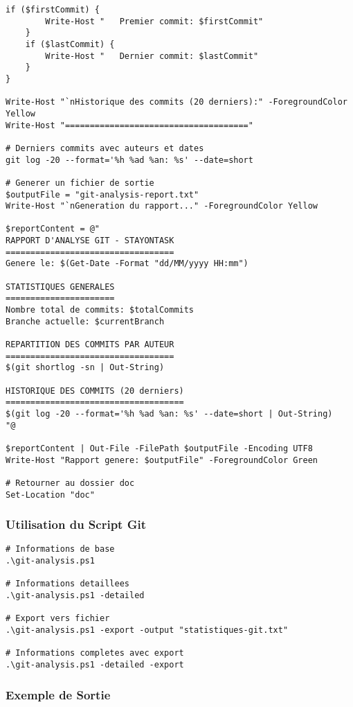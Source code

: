 \documentclass[12pt,a4paper]{article}
\begin{document}
\begin{lstlisting}[caption=Script d'extraction Git complet - git-analysis.ps1]
    if ($firstCommit) {
        Write-Host "   Premier commit: $firstCommit"
    }
    if ($lastCommit) {
        Write-Host "   Dernier commit: $lastCommit"
    }
}

Write-Host "`nHistorique des commits (20 derniers):" -ForegroundColor Yellow
Write-Host "====================================="

# Derniers commits avec auteurs et dates
git log -20 --format='%h %ad %an: %s' --date=short

# Generer un fichier de sortie
$outputFile = "git-analysis-report.txt"
Write-Host "`nGeneration du rapport..." -ForegroundColor Yellow

$reportContent = @"
RAPPORT D'ANALYSE GIT - STAYONTASK
==================================
Genere le: $(Get-Date -Format "dd/MM/yyyy HH:mm")

STATISTIQUES GENERALES
======================
Nombre total de commits: $totalCommits
Branche actuelle: $currentBranch

REPARTITION DES COMMITS PAR AUTEUR
==================================
$(git shortlog -sn | Out-String)

HISTORIQUE DES COMMITS (20 derniers)
====================================
$(git log -20 --format='%h %ad %an: %s' --date=short | Out-String)
"@

$reportContent | Out-File -FilePath $outputFile -Encoding UTF8
Write-Host "Rapport genere: $outputFile" -ForegroundColor Green

# Retourner au dossier doc
Set-Location "doc"
\end{lstlisting}

\subsubsection{Utilisation du Script Git}

\begin{lstlisting}[caption=Utilisation du script d'extraction Git]
# Informations de base
.\git-analysis.ps1

# Informations detaillees
.\git-analysis.ps1 -detailed

# Export vers fichier
.\git-analysis.ps1 -export -output "statistiques-git.txt"

# Informations completes avec export
.\git-analysis.ps1 -detailed -export
\end{lstlisting}

\subsubsection{Exemple de Sortie}
\end{document}
